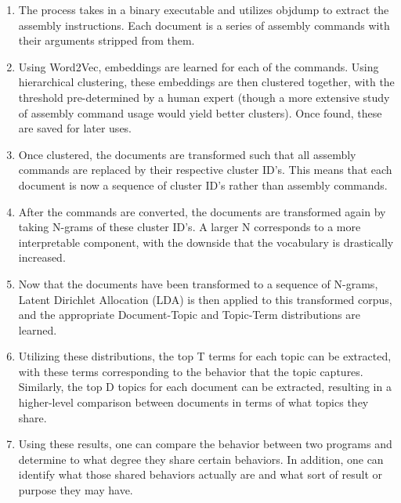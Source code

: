 \begin{enumerate}
	\item The process takes in a binary executable and utilizes objdump \cite{objdump} to extract the assembly instructions. Each document is a series of assembly commands with their arguments stripped from them.
	\item Using Word2Vec, embeddings are learned for each of the commands. Using hierarchical clustering, these embeddings are then clustered together, with the threshold pre-determined by a human expert (though a more extensive study of assembly command usage would yield better clusters). Once found, these are saved for later uses.
	\item Once clustered, the documents are transformed such that all assembly commands are replaced by their respective cluster ID's. This means that each document is now a sequence of cluster ID's rather than assembly commands.
	\item After the commands are converted, the documents are transformed again by taking N-grams of these cluster ID's. A larger N corresponds to a more interpretable component, with the downside that the vocabulary is drastically increased.
	\item Now that the documents have been transformed to a sequence of N-grams, Latent Dirichlet Allocation (LDA) is then applied to this transformed corpus, and the appropriate Document-Topic and Topic-Term distributions are learned.
	\item Utilizing these distributions, the top T terms for each topic can be extracted, with these terms corresponding to the behavior that the topic captures. Similarly, the top D topics for each document can be extracted, resulting in a higher-level comparison between documents in terms of what topics they share.
	\item Using these results, one can compare the behavior between two programs and determine to what degree they share certain behaviors. In addition, one can identify what those shared behaviors actually are and what sort of result or purpose they may have.
\end{enumerate}

